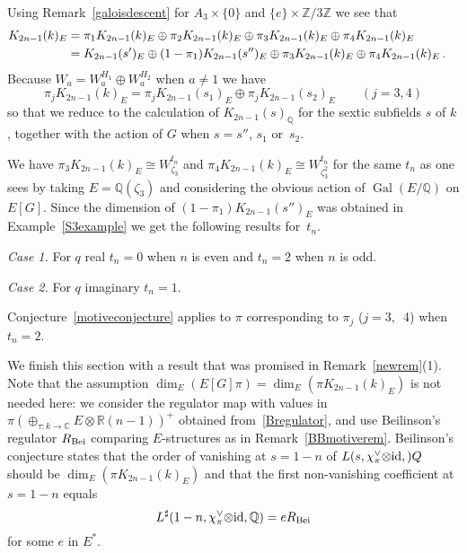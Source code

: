 \documentclass{amsart}
\begin{document}
\begin{example}
Using Remark~\ref{galoisdescent} for $ A_3 \times \{0\} $ and $ \{e\} \times {\mathbb Z}/3{\mathbb Z} $ we see that 
\[
\begin{aligned}
{K_{2n-1}(k)_E}& = \pi_1 {K_{2n-1}(k)_E}\oplus \pi_2 {K_{2n-1}(k)_E}\oplus \pi_3 {K_{2n-1}(k)_E}\oplus \pi_4 {K_{2n-1}(k)_E}
\cr
      & = {K_{2n-1}(s')_E}\oplus (1-\pi_1) {K_{2n-1}(s'')_E}\oplus \pi_3 {K_{2n-1}(k)_E}\oplus \pi_4 {K_{2n-1}(k)_E}
\,.
\end{aligned}
\]
Because $ W_a = W_a^{H_1} \oplus W_a^{H_2} $ when $ a \ne 1 $ we have
\[
\pi_j {K_{2n-1}(k)_E}= \pi_j {K_{2n-1}(s_1)_E}\oplus \pi_j {K_{2n-1}(s_2)_E}
\qquad (j=3, 4)
\]
so that we reduce to the calculation of $ {K_{2n-1}(s)_{\mathbb Q}}$ for the sextic subfields $ s $ of $ k $,
together with the action of $ G $ when $ s = s'' $, $ s_1 $ or~$ s_2 $.

We have $ \pi_3 {K_{2n-1}(k)_E}{\cong} W_{{\zeta}_3}^{t_n} $ and $ \pi_4 {K_{2n-1}(k)_E}{\cong} W_{{\zeta}_3^2}^{t_n} $ for the same $ t_n $
as one sees by taking $  E = {\mathbb Q}({\zeta}_3) $ and considering the obvious action of $ {\operatorname{Gal}}(E/{\mathbb Q}) $ on $ E[G] $.
Since the dimension of $ (1-\pi_1) {K_{2n-1}(s'')_E}$ was obtained in Example~\ref{S3example} we get the following
results for~$ t_n $.

{\it Case 1.\/}
For $ q $ real $ t_n = 0 $ when $ n $ is even and $ t_n=2 $ when $ n $ is odd.

{\it Case 2.\/}
For $ q $ imaginary $ t_n = 1 $.

\noindent
Conjecture~\ref{motiveconjecture} applies to $ \pi $ corresponding to $ \pi_j $ ($ j=3, $~4)
when $ t_n=2 $.
\end{example}

We finish this section with a result that was promised in Remark~\ref{newrem}(1).  Note that the assumption 
$ \dim_E(E[G]\pi) = \dim_E(\pi {K_{2n-1}(k)_E}) $ is not needed here: we consider the regulator map with
values in $ \pi(\oplus_{{\tau}:k\to{\mathbb C}} E{\otimes} {\mathbb R}(n-1))^+ $ obtained from~\eqref{Bregulator}, and use Beilinson's
regulator $ R_{\textup{Bei}} $ comparing $ E $-structures as in Remark~\ref{BBmotiverem}.  
Beilinson's conjecture \cite[Conjecture~3.4]{bei85} states that the order of vanishing at $ s=1-n $ of
$ {L(s,{\chi_\pi^\vee{\otimes}{\textup{id}}},{\mathbb)}Q} $ should be $ \dim_E(\pi {K_{2n-1}(k)_E}) $ and that 
the first non-vanishing coefficient at $ s=1-n $ equals
\begin{equation*}
{L^\sharp({1-n},{\chi_\pi^\vee{\otimes}{\textup{id}}},{\mathbb Q})}= e R_{\textup{Bei}}
\end{equation*}
for some $ e $ in $ E^* $.  
\end{document}
